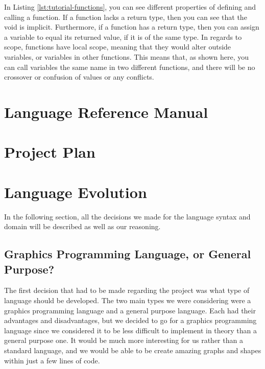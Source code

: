 \documentclass{l3proj}
\begin{document}
In Listing \ref{lst:tutorial-functions}, you can see different properties of defining and calling a function. If a function lacks a return type, then you can see that the void is implicit. Furthermore, if a function has a return type, then you can assign a variable to equal its returned value, if it is of the same type. In regards to scope, functions have local scope, meaning that they would alter outside variables, or variables in other functions. This means that, as shown here, you can call variables the same name in two different functions, and there will be no crossover or confusion of values or any conflicts.


\chapter{Language Reference Manual}
\label{manual}

\chapter{Project Plan}
\label{plan}

\chapter{Language Evolution}
\label{evo}
In the following section, all the decisions we made for the language syntax and domain will be described as well as our reasoning. 

\section{Graphics Programming Language, or General Purpose?}
The first decision that had to be made regarding the project was what type of language should be developed. The two main types we were considering were a graphics programming language and a general purpose language. Each had their advantages and disadvantages, but we decided to go for a graphics programming language since we considered it to be less difficult to implement in theory than a general purpose one. It would be much more interesting for us rather than a standard language, and we would be able to be create amazing graphs and shapes within just a few lines of code.  
\end{document}
